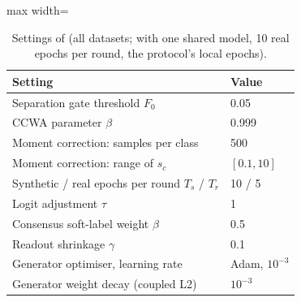 \begin{table}[t]
\centering\small
\caption{Settings of \ours (all datasets; with one shared model, 10 real epochs per round, the protocol's local
epochs).}
\label{tab:hyper}
\begin{adjustbox}{max width=\linewidth}
\begin{tabular}{ll}
\toprule
Setting & Value\\
\midrule
Separation gate threshold $F_0$ & 0.05\\
CCWA parameter $\beta$ & 0.999\\
Moment correction: samples per class & 500\\
Moment correction: range of $s_c$ & $[0.1, 10]$\\
Synthetic / real epochs per round $T_s$ / $T_r$ & 10 / 5\\
Logit adjustment $\tau$ & 1\\
Consensus soft-label weight $\beta$ & 0.5\\
Readout shrinkage $\gamma$ & 0.1\\
Generator optimiser, learning rate & Adam, $10^{-3}$\\
Generator weight decay (coupled L2) & $10^{-3}$\\
\bottomrule
\end{tabular}
\end{adjustbox}
\end{table}
